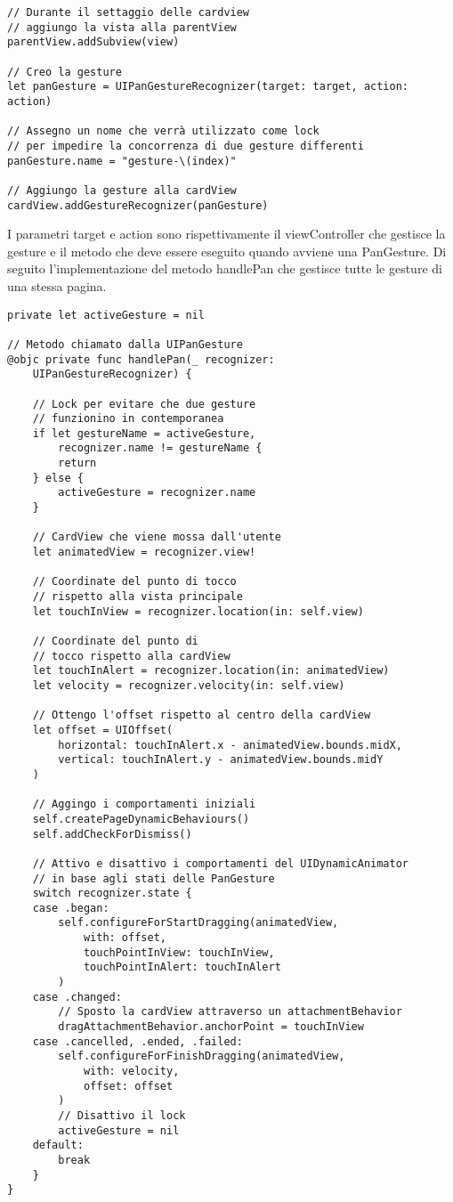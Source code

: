 \begin{verbatim}
// Durante il settaggio delle cardview
// aggiungo la vista alla parentView
parentView.addSubview(view)

// Creo la gesture
let panGesture = UIPanGestureRecognizer(target: target, action: action)

// Assegno un nome che verrà utilizzato come lock
// per impedire la concorrenza di due gesture differenti
panGesture.name = "gesture-\(index)"

// Aggiungo la gesture alla cardView
cardView.addGestureRecognizer(panGesture)
\end{verbatim}

I parametri target e action sono rispettivamente il viewController che gestisce la gesture e il metodo
che deve essere eseguito quando avviene una PanGesture.
Di seguito l'implementazione del metodo handlePan che gestisce tutte le gesture di una stessa pagina.

\begin{verbatim}
private let activeGesture = nil

// Metodo chiamato dalla UIPanGesture
@objc private func handlePan(_ recognizer:
    UIPanGestureRecognizer) {

    // Lock per evitare che due gesture
    // funzionino in contemporanea
    if let gestureName = activeGesture,
        recognizer.name != gestureName {
        return
    } else {
        activeGesture = recognizer.name
    }
    
    // CardView che viene mossa dall'utente
    let animatedView = recognizer.view!
    
    // Coordinate del punto di tocco
    // rispetto alla vista principale
    let touchInView = recognizer.location(in: self.view)

    // Coordinate del punto di
    // tocco rispetto alla cardView
    let touchInAlert = recognizer.location(in: animatedView)
    let velocity = recognizer.velocity(in: self.view)
    
    // Ottengo l'offset rispetto al centro della cardView
    let offset = UIOffset(
        horizontal: touchInAlert.x - animatedView.bounds.midX,
        vertical: touchInAlert.y - animatedView.bounds.midY
    )

    // Aggingo i comportamenti iniziali
    self.createPageDynamicBehaviours()
    self.addCheckForDismiss()
    
    // Attivo e disattivo i comportamenti del UIDynamicAnimator
    // in base agli stati delle PanGesture
    switch recognizer.state {
    case .began:
        self.configureForStartDragging(animatedView,
            with: offset,
            touchPointInView: touchInView,
            touchPointInAlert: touchInAlert
        )
    case .changed:
        // Sposto la cardView attraverso un attachmentBehavior
        dragAttachmentBehavior.anchorPoint = touchInView
    case .cancelled, .ended, .failed:
        self.configureForFinishDragging(animatedView,
            with: velocity,
            offset: offset
        )
        // Disattivo il lock
        activeGesture = nil
    default:
        break
    }
}
\end{verbatim}

